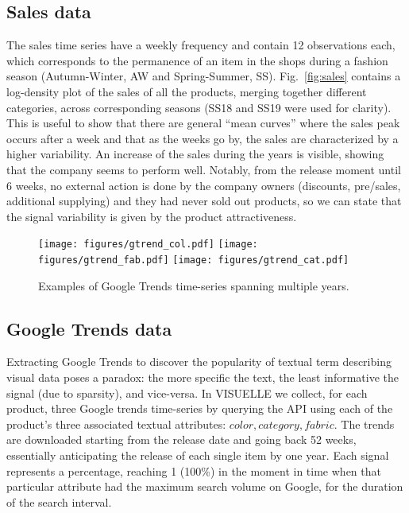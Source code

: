 \documentclass{article}
\newcommand{\datasetname}[0] {VISUELLE}
\begin{document}
\subsection{Sales data}
The sales time series have a weekly frequency and contain 12 observations each, which corresponds to the permanence of an item in the shops during a fashion season (Autumn-Winter, AW and Spring-Summer, SS). Fig.~\ref{fig:sales} contains a log-density plot of the sales of all the products, merging together different categories, across corresponding seasons (SS18 and SS19 were used for clarity). This is useful to show that there are general ``mean curves'' where the sales peak occurs after a week and that as the weeks go by, the sales are characterized by a higher variability. An increase of the sales during the years is visible, showing that the company seems to perform well. Notably, from the release moment until 6 weeks, no external action is done by the company owners (discounts, pre/sales, additional supplying) and they had never sold out products, so we can state that the signal variability is given by the product attractiveness. 


\begin{figure*}[h]
    \centering
    \texttt{[image: figures/gtrend\_col.pdf]}\hfill
    \texttt{[image: figures/gtrend\_fab.pdf]}\hfill
    \texttt{[image: figures/gtrend\_cat.pdf]}\hfill
    \caption{Examples of Google Trends time-series spanning multiple years.}
    \label{fig:structuredTrend}
\end{figure*}

\subsection{Google Trends data}\label{sec:gtrend_collection}
Extracting Google Trends to discover the popularity of textual term describing visual data poses a paradox: the more specific the text, the least informative the signal (due to sparsity), and vice-versa. In \datasetname{} we collect, for each product, three Google trends time-series by querying the API using each of the product's three associated textual attributes: ${color, category, fabric}$. The trends are downloaded starting from the release date and going back 52 weeks, essentially anticipating the release of each single item by one year. Each signal represents a percentage, reaching 1 (100\%) in the moment in time when that particular attribute had the maximum search volume on Google, for the duration of the search interval. 
\end{document}
